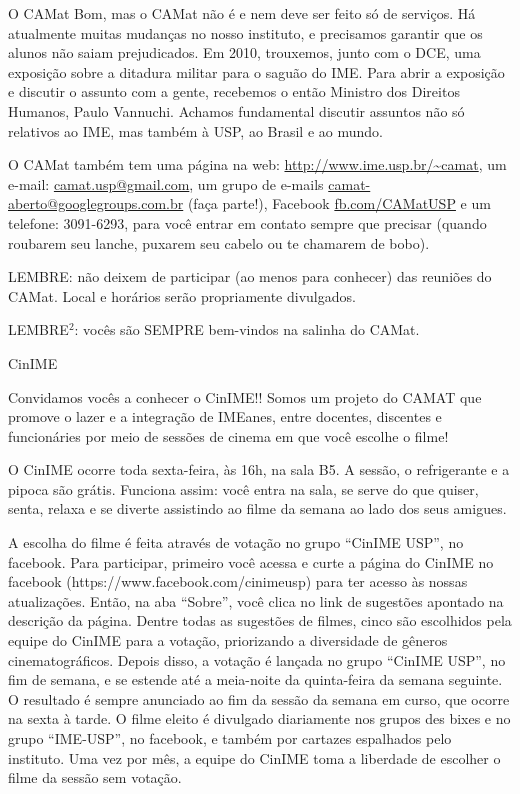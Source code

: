 \begin{secao}{O CAMat}
Bom, mas o CAMat não é e nem deve ser feito só de serviços. Há atualmente
muitas mudanças no nosso instituto, e precisamos garantir que os alunos não
saiam prejudicados. Em 2010, trouxemos, junto com o
DCE, uma exposição sobre a ditadura militar para o saguão do IME. Para abrir a
exposição e discutir o assunto com a gente, recebemos o então Ministro dos
Direitos Humanos, Paulo Vannuchi. Achamos fundamental discutir assuntos não só
relativos ao IME, mas também à USP, ao Brasil e ao mundo.


O CAMat também tem uma página na web: \url{http://www.ime.usp.br/~camat}, um
e-mail: \url{camat.usp@gmail.com}, um grupo de e-mails \url{camat-aberto@googlegroups.com.br} (faça parte!), Facebook \url{fb.com/CAMatUSP} e um telefone: 3091-6293, para você entrar em contato sempre
que precisar (quando roubarem seu lanche, puxarem seu cabelo ou te chamarem de
bobo).

LEMBRE: não deixem de participar (ao menos para conhecer) das reuniões do
CAMat. Local e horários serão propriamente divulgados.

LEMBRE$^2$: vocês são SEMPRE bem-vindos na salinha do CAMat.

\begin{subsecao}{CinIME}

Convidamos vocês a conhecer o CinIME!! Somos um projeto do CAMAT que promove o
lazer e a integração de IMEanes, entre docentes, discentes e funcionáries por
meio de sessões de cinema em que você escolhe o filme!

O CinIME ocorre toda sexta-feira, às 16h, na sala B5. A sessão, o refrigerante
e a pipoca são grátis. Funciona assim: você entra na sala, se serve do que
quiser, senta, relaxa e se diverte assistindo ao filme da semana ao lado dos
seus amigues.

A escolha do filme é feita através de votação no grupo “CinIME USP”, no
facebook. Para participar, primeiro você acessa e curte a página do CinIME no
facebook (https://www.facebook.com/cinimeusp) para ter acesso às nossas
atualizações. Então, na aba “Sobre”, você clica no link de sugestões apontado
na descrição da página. Dentre todas as sugestões de filmes, cinco são
escolhidos pela equipe do CinIME para a votação, priorizando a diversidade de
gêneros cinematográficos. Depois disso, a votação é lançada no grupo “CinIME
USP”, no fim de semana, e se estende até a meia-noite da quinta-feira da semana
seguinte. O resultado é sempre anunciado ao fim da sessão da semana em curso,
que ocorre na sexta à tarde. O filme eleito é divulgado diariamente nos grupos
des bixes e no grupo “IME-USP”, no facebook, e também por cartazes espalhados
pelo instituto. Uma vez por mês, a equipe do CinIME toma a liberdade de
escolher o filme da sessão sem votação.


\end{subsecao}
\end{secao}
